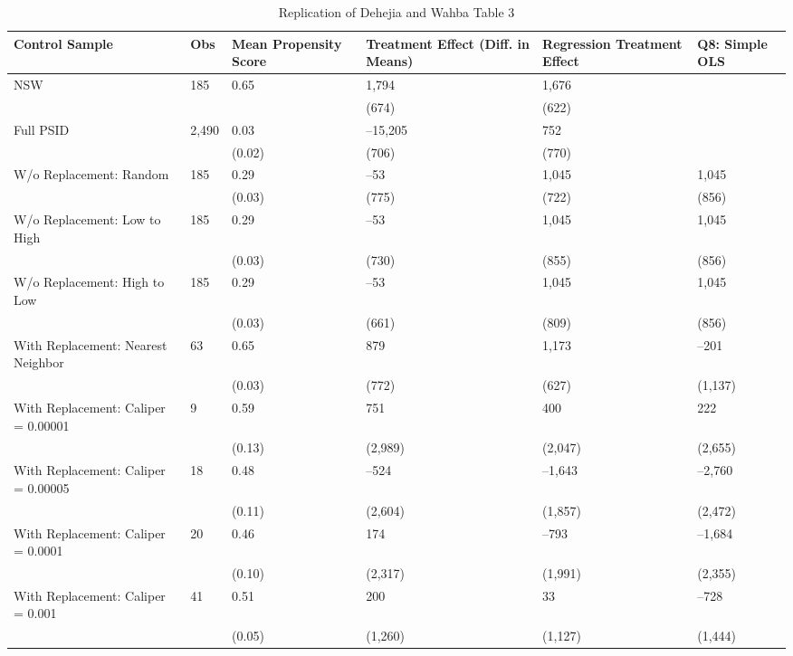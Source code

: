 \begin{table}[tbp] \centering
{}

\caption{Replication of Dehejia and Wahba Table 3}
\begin{tabularx}{\linewidth}{@{}lCCCCC@{}}

\toprule
{Control Sample}&{Obs}&{Mean Propensity Score}&{Treatment Effect (Diff. in Means)}&{Regression Treatment Effect}&{Q8: Simple OLS} \tabularnewline
\midrule \addlinespace[\belowrulesep]
NSW&185&0.65&1,794&1,676& \tabularnewline
&&&(674)&(622)& \tabularnewline
Full PSID&2,490&0.03&--15,205&752& \tabularnewline
&&(0.02)&(706)&(770)& \tabularnewline
W/o Replacement: Random&185&0.29&--53&1,045&1,045 \tabularnewline
&&(0.03)&(775)&(722)&(856) \tabularnewline
W/o Replacement: Low to High&185&0.29&--53&1,045&1,045 \tabularnewline
&&(0.03)&(730)&(855)&(856) \tabularnewline
W/o Replacement: High to Low&185&0.29&--53&1,045&1,045 \tabularnewline
&&(0.03)&(661)&(809)&(856) \tabularnewline
With Replacement: Nearest Neighbor&63&0.65&879&1,173&--201 \tabularnewline
&&(0.03)&(772)&(627)&(1,137) \tabularnewline
With Replacement: Caliper = 0.00001&9&0.59&751&400&222 \tabularnewline
&&(0.13)&(2,989)&(2,047)&(2,655) \tabularnewline
With Replacement: Caliper = 0.00005&18&0.48&--524&--1,643&--2,760 \tabularnewline
&&(0.11)&(2,604)&(1,857)&(2,472) \tabularnewline
With Replacement: Caliper = 0.0001&20&0.46&174&--793&--1,684 \tabularnewline
&&(0.10)&(2,317)&(1,991)&(2,355) \tabularnewline
With Replacement: Caliper = 0.001&41&0.51&200&33&--728 \tabularnewline
&&(0.05)&(1,260)&(1,127)&(1,444) \tabularnewline
\bottomrule 

\end{tabularx}
\end{table}
